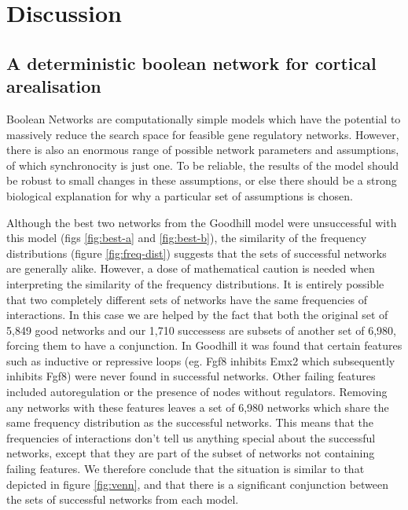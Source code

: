 \documentclass[a4paper,11pt]{article}
\begin{document}
\newpage{}
\section{Discussion}
\subsection{A deterministic boolean network for cortical arealisation}
Boolean Networks are computationally simple models which have the potential to massively reduce the search space for feasible gene regulatory networks. However, there is also an enormous range of possible network parameters and assumptions, of which synchronocity is just one. To be reliable, the results of the model should be robust to small changes in these assumptions, or else there should be a strong biological explanation for why a particular set of assumptions is chosen.
\par

Although the best two networks from the Goodhill model were unsuccessful with this model (figs \ref{fig:best-a} and \ref{fig:best-b}), the similarity of the frequency distributions (figure \ref{fig:freq-dist}) suggests that the sets of successful networks are generally alike. However, a dose of mathematical caution is needed when interpreting the similarity of the frequency distributions. It is entirely possible that two completely different sets of networks have the same frequencies of interactions. In this case we are helped by the fact that both the original set of 5,849 good networks and our 1,710 successess are subsets of another set of 6,980, forcing them to have a conjunction. In Goodhill it was found that certain features such as inductive or repressive loops (eg. Fgf8 inhibits Emx2 which subsequently inhibits Fgf8) were never found in successful networks. Other failing features included autoregulation or the presence of nodes without regulators. Removing any networks with these features leaves a set of 6,980 networks which share the same frequency distribution as the successful networks. This means that the frequencies of interactions don't tell us anything special about the successful networks, except that they are part of the subset of networks not containing failing features. We therefore conclude that the situation is similar to that depicted in figure \ref{fig:venn}, and that there is a significant conjunction between the sets of successful networks from each model. 
\par
\end{document}
